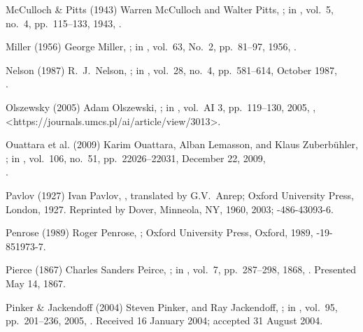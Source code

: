 \biblabel McCulloch \& Pitts (1943)
Warren McCulloch and Walter Pitts,
;
in ,
vol.\ 5, no.\ 4, pp.\ 115--133, 1943,
.

\biblabel Miller (1956)
 George Miller,
;
in ,
vol.\ 63, No.\ 2, pp.\ 81--97, 1956,
.

\biblabel Nelson (1987)
R.\ J.\ Nelson,
;
in ,
vol.\ 28, no.\ 4, pp.\ 581--614, October 1987,\\
.

\biblabel Olszewsky (2005)
Adam Olszewski,
;
in ,
vol.\ AI 3, pp.\ 119--130, 2005,
,
\URL<https://journals.umcs.pl/ai/article/view/3013>.

\biblabel Ouattara et al. (2009)
Karim Ouattara, Alban Lemasson, and Klaus Zuberbühler,\\
;
in ,
vol.\ 106, no.\ 51, pp.\ 22026--22031, December 22, 2009,\\
.

\biblabel Pavlov (1927)
Ivan Pavlov,
,
translated by G.V.\ Anrep;
Oxford University Press, London, 1927.
Reprinted by Dover, Minneola, NY, 1960, 2003;
-486-43093-6.

\biblabel Penrose (1989)
Roger Penrose, \negthinspace
{};
Oxford University Press, Oxford, 1989,
-19-851973-7.

\biblabel Pierce (1867)
Charles Sanders Peirce,
;
in ,
vol.\ 7, pp.\ 287--298, 1868,
.
Presented May 14, 1867.

\biblabel Pinker \& Jackendoff (2004)
Steven Pinker, and Ray Jackendoff,
;
in ,
vol.\ 95, pp.\ 201--236, 2005,
.
Received 16 January 2004; accepted 31 August 2004.

